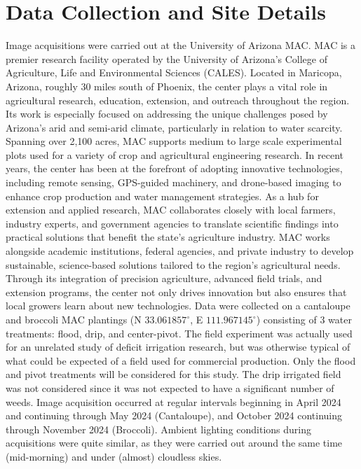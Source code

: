 \documentclass[letterpaper, notitlepage]{report}
\begin{document}
\section{Data Collection and Site Details}
Image acquisitions were carried out at the University of Arizona \gls{MAC}. MAC is a premier research facility operated by the University of Arizona's College of Agriculture, Life and Environmental Sciences (CALES). Located in Maricopa, Arizona, roughly 30 miles south of Phoenix, the center plays a vital role in agricultural research, education, extension, and outreach throughout the region. Its work is especially focused on addressing the unique challenges posed by Arizona’s arid and semi-arid climate, particularly in relation to water scarcity. Spanning over 2,100 acres, MAC supports medium to large scale experimental plots used for a variety of crop and agricultural engineering research. In recent years, the center has been at the forefront of adopting innovative technologies, including remote sensing, GPS-guided machinery, and drone-based imaging to enhance crop production and water management strategies. As a hub for extension and applied research, MAC collaborates closely with local farmers, industry experts, and government agencies to translate scientific findings into practical solutions that benefit the state’s agriculture industry. 
MAC works alongside academic institutions, federal agencies, and private industry to develop sustainable, science-based solutions tailored to the region's agricultural needs. Through its integration of precision agriculture, advanced field trials, and extension programs, the center not only drives innovation but also ensures that local growers learn about new technologies.
Data were collected on a cantaloupe and broccoli MAC plantings (N $33.061857^\circ$, E $111.967145^\circ$) consisting of 3 water treatments: flood, drip, and center-pivot. The field experiment was actually used for an unrelated study of deficit irrigation research, but was otherwise typical of what could be expected of a field used for commercial production. Only the flood and pivot treatments will be considered for this study. The drip irrigated field was not considered since it was not expected to have a significant number of weeds.  Image acquisition occurred at regular intervals beginning in April 2024 and continuing through May 2024 (Cantaloupe), and October 2024 continuing through November 2024 (Broccoli).  Ambient lighting conditions during acquisitions were quite similar, as they were carried out around the same time (mid-morning) and under (almost) cloudless skies.
\end{document}
